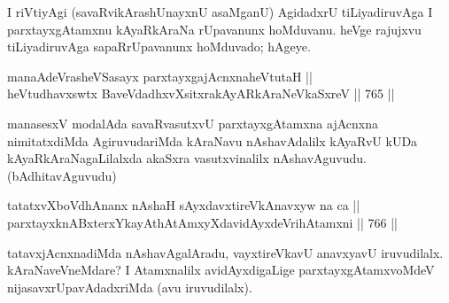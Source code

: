\begin{artha} 
I riVtiyAgi (savaRvikArashUnayxnU asaMganU) AgidadxrU tiLiyadiruvAga I 
parxtayxgAtamxnu kAyaRkAraNa rUpavanunx hoMduvanu. heVge rajujxvu 
tiLiyadiruvAga sapaRrUpavanunx hoMduvado; hAgeye.  
\end{artha}
	

\begin{shl}
manaAdeVrasheVSasayx parxtayxgajAcnxnaheVtutaH || \\
heVtudhavxswtx BaveVdadhxvXsitxrakAyARkAraNeV\s kaSxreV \hfill || 765 ||  
\end{shl}

\begin{artha} 
manasesxV modalAda savaRvasutxvU parxtayxgAtamxna ajAcnxna nimitatxdiMda AgiruvudariMda kAraNavu nAshavAdalilx kAyaRvU kUDa kAyaRkAraNagaLilalxda akaSxra vasutxvinalilx nAshavAguvudu. (bAdhitavAguvudu)
\end{artha}


\begin{shl}
tatatxvXboVdhAnanx \footnotemark[1]nAshaH sAyxdavxtireVkA\footnotemark[2]navxyw na ca || \\
parxtayxknABxterxYkayAthAtAmxyXdavidAyxdeVrihA\s \s tamxni \hfill || 766 ||  
\end{shl}

\begin{artha} 
tatavxjAcnxnadiMda nAshavAgalAradu, vayxtireVkavU anavxyavU iruvudilalx. kAraNaveVneMdare? I Atamxnalilx avidAyxdigaLige parxtayxgAtamxvoMdeV nijasavxrUpavAdadxriMda (avu iruvudilalx).
\end{artha}

